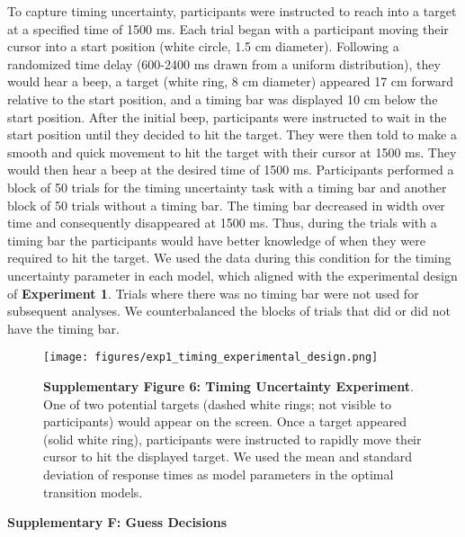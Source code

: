 \documentclass[12pt]{article}
\newcommand\boldblue[1]{\textcolor{mydarkblue}{\textbf{#1}}}
\begin{document}
\noindent To capture timing uncertainty, participants were instructed to reach into a target at a specified time of 1500 ms. Each trial began with a participant moving their cursor into a start position (white circle, 1.5 cm diameter). Following a randomized time delay (600-2400 ms drawn from a uniform distribution), they would hear a beep, a target (white ring, 8 cm diameter) appeared 17 cm forward relative to the start position, and a timing bar was displayed 10 cm below the start position. After the initial beep, participants were instructed to wait in the start position until they decided to hit the target. They were then told to make a smooth and quick movement to hit the target with their cursor at 1500 ms. They would then hear a beep at the desired time of 1500 ms. Participants performed a block of 50 trials for the timing uncertainty task with a timing bar and another block of 50 trials without a timing bar. The timing bar decreased in width over time and consequently disappeared at 1500 ms. Thus, during the trials with a timing bar the participants would have better knowledge of when they were required to hit the target. We used the data during this condition for the timing uncertainty parameter in each model, which aligned with the experimental design of \boldblue{Experiment 1}. Trials where there was no timing bar were not used for subsequent analyses. We counterbalanced the blocks of trials that did or did not have the timing bar.
\begin{figure}[H]
    \centering
    \texttt{[image: figures/exp1\_timing\_experimental\_design.png]}

    \caption*{\boldblue{Supplementary Figure 6: Timing Uncertainty Experiment}. One of two potential targets (dashed white rings; not visible to participants) would appear on the screen. Once a target appeared (solid white ring), participants were instructed to rapidly move their cursor to hit the displayed target. We used the mean and standard deviation of response times as model parameters in the optimal transition models.}
\end{figure}

\newpage
\noindent\boldblue{\large\textcolor{mydarkblue}{Supplementary F: Guess Decisions}}
\end{document}
